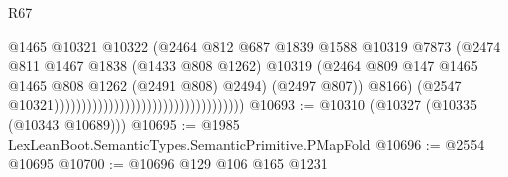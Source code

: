 \begin{lexlean}{R67}
\begin{coremodule}
                                                                        @1465
                                                                        @10321
                                                                        @10322
                                                                        (@2464
                                                                          @812
                                                                          @687
                                                                          @1839
                                                                          @1588
                                                                          @10319
                                                                          @7873
                                                                          (@2474
                                                                            @811
                                                                            @1467
                                                                            @1838
                                                                            (@1433 @808 @1262)
                                                                            @10319
                                                                            (@2464
                                                                              @809
                                                                              @147
                                                                              @1465
                                                                              @1465
                                                                              @808
                                                                              @1262
                                                                              (@2491 @808)
                                                                              @2494)
                                                                            (@2497 @807))
                                                                          @8166)
                                                                        (@2547
                                                                          @10321)))))))))))))))))))))))))))))))))))
@10693 := @10310 (@10327 (@10335 (@10343 @10689)))
@10695 := @1985 LexLeanBoot.SemanticTypes.SemanticPrimitive.PMapFold
@10696 := @2554 @10695
@10700 := @10696 @129 @106 @165 @1231

\end{coremodule}
\end{lexlean}
